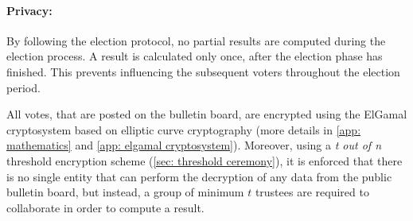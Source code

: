 



\paragraph{Privacy:}
By following the election protocol, no partial results are computed during the election process. A result is calculated only once, after the election phase has finished. This prevents influencing the subsequent voters throughout the election period.

All votes, that are posted on the bulletin board, are encrypted using the ElGamal cryptosystem based on elliptic curve cryptography (more details in \cref{app: mathematics} and \cref{app: elgamal cryptosystem}). Moreover, using a \textit{t out of n} threshold encryption scheme (\cref{sec: threshold ceremony}), it is enforced that there is no single entity that can perform the decryption of any data from the public bulletin board, but instead, a group of minimum $t$ trustees are required to collaborate in order to compute a result.

